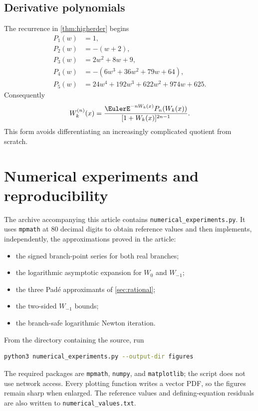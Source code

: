 \documentclass[11pt]{article}
\theoremstyle{remark}
\begin{document}
\subsection{Derivative polynomials}

The recurrence in \cref{thm:higherder} begins
\begin{align*}
 P_1(w)&=1,\\
 P_2(w)&=-(w+2),\\
 P_3(w)&=2w^2+8w+9,\\
 P_4(w)&=-(6w^3+36w^2+79w+64),\\
 P_5(w)&=24w^4+192w^3+622w^2+974w+625.
\end{align*}
Consequently
\[
 W_k^{(n)}(x)
 =\frac{\EulerE^{-nW_k(x)}P_n(W_k(x))}
       {[1+W_k(x)]^{2n-1}}.
\]
This form avoids differentiating an increasingly complicated quotient from
scratch.

\section{Numerical experiments and reproducibility}\label{app:numerics}

The archive accompanying this article contains
\texttt{numerical\_experiments.py}.  It uses
\texttt{mpmath} at 80 decimal digits to obtain reference values and then
implements, independently, the approximations proved in the article:

\begin{itemize}
\item the signed branch-point series for both real branches;
\item the logarithmic asymptotic expansion for \(W_0\) and \(W_{-1}\);
\item the three Pad\'e approximants of \cref{sec:rational};
\item the two-sided \(W_{-1}\) bounds;
\item the branch-safe logarithmic Newton iteration.
\end{itemize}

From the directory containing the source, run
\begin{lstlisting}[language=bash]
python3 numerical_experiments.py --output-dir figures
\end{lstlisting}
The required packages are \texttt{mpmath}, \texttt{numpy}, and
\texttt{matplotlib}; the script does not use network access.  Every plotting
function writes a vector PDF, so the figures remain sharp when enlarged.
The reference values and defining-equation residuals are also written to
\texttt{numerical\_values.txt}.
\end{document}
